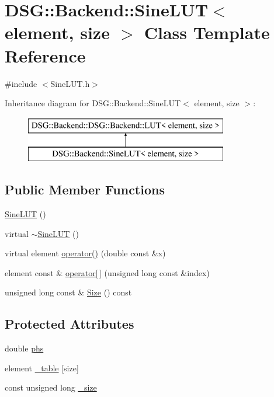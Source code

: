 \hypertarget{classDSG_1_1Backend_1_1SineLUT}{\section{D\+S\+G\+:\+:Backend\+:\+:Sine\+L\+U\+T$<$ element, size $>$ Class Template Reference}
\label{classDSG_1_1Backend_1_1SineLUT}
}


{\ttfamily \#include $<$Sine\+L\+U\+T.\+h$>$}

Inheritance diagram for D\+S\+G\+:\+:Backend\+:\+:Sine\+L\+U\+T$<$ element, size $>$\+:\begin{figure}[H]
\begin{center}
\leavevmode
\includegraphics[height=2.000000cm]{classDSG_1_1Backend_1_1SineLUT}
\end{center}
\end{figure}
\subsection*{Public Member Functions}
\begin{DoxyCompactItemize}
\item 
\hyperlink{classDSG_1_1Backend_1_1SineLUT_a9da7b21af95cd94c4f7b9bd6b71cbb70}{Sine\+L\+U\+T} ()
\item 
virtual \hyperlink{classDSG_1_1Backend_1_1SineLUT_af910f9329f237b770c6b409b598fe5c9}{$\sim$\+Sine\+L\+U\+T} ()
\item 
virtual element \hyperlink{classDSG_1_1Backend_1_1SineLUT_a3d8ccd4f4ad7326100577346f0eb7e9b}{operator()} (double const \&x)
\item 
element const \& \hyperlink{classDSG_1_1Backend_1_1DSG_1_1Backend_1_1LUT_acd6db2fa4eba392de1cbb4795f351f8a}{operator\mbox{[}$\,$\mbox{]}} (unsigned long const \&index)
\item 
unsigned long const \& \hyperlink{classDSG_1_1Backend_1_1DSG_1_1Backend_1_1LUT_a65daa6f46f978a64da1c86089847602d}{Size} () const 
\end{DoxyCompactItemize}
\subsection*{Protected Attributes}
\begin{DoxyCompactItemize}
\item 
double \hyperlink{classDSG_1_1Backend_1_1SineLUT_a4745a2ef3a5cec8f2822fa12174e059b}{phs}
\item 
element \hyperlink{classDSG_1_1Backend_1_1DSG_1_1Backend_1_1LUT_a427da4b7eccdfe25e3c1889a8c2fdea6}{\+\_\+table} \mbox{[}size\mbox{]}
\item 
const unsigned long \hyperlink{classDSG_1_1Backend_1_1DSG_1_1Backend_1_1LUT_aa48956aa4debf08fdb517cb751d3e01d}{\+\_\+size}
\end{DoxyCompactItemize}



